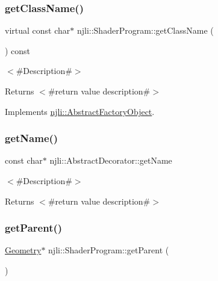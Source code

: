 \subsubsection{\texorpdfstring{get\+Class\+Name()}{getClassName()}}
{\footnotesize\ttfamily virtual const char$\ast$ njli\+::\+Shader\+Program\+::get\+Class\+Name (\begin{DoxyParamCaption}{ }\end{DoxyParamCaption}) const\hspace{0.3cm}{\ttfamily [virtual]}}

$<$\#\+Description\#$>$

\begin{DoxyReturn}{Returns}
$<$\#return value description\#$>$ 
\end{DoxyReturn}


Implements \mbox{\hyperlink{classnjli_1_1_abstract_factory_object_af4151e41b80d5bc3fc42822c67fc2278}{njli\+::\+Abstract\+Factory\+Object}}.

\mbox{\label{classnjli_1_1_shader_program_ad41266885be835f3ee602311e20877a4}} 
\subsubsection{\texorpdfstring{get\+Name()}{getName()}}
{\footnotesize\ttfamily const char$\ast$ njli\+::\+Abstract\+Decorator\+::get\+Name}

$<$\#\+Description\#$>$

\begin{DoxyReturn}{Returns}
$<$\#return value description\#$>$ 
\end{DoxyReturn}
\mbox{\label{classnjli_1_1_shader_program_a663abf703712e6cbdffd9ac7ee2631b9}} 
\subsubsection{\texorpdfstring{get\+Parent()}{getParent()}\hspace{0.1cm}{\footnotesize\ttfamily [1/2]}}
{\footnotesize\ttfamily \mbox{\hyperlink{classnjli_1_1_geometry}{Geometry}}$\ast$ njli\+::\+Shader\+Program\+::get\+Parent (\begin{DoxyParamCaption}{ }\end{DoxyParamCaption})}

